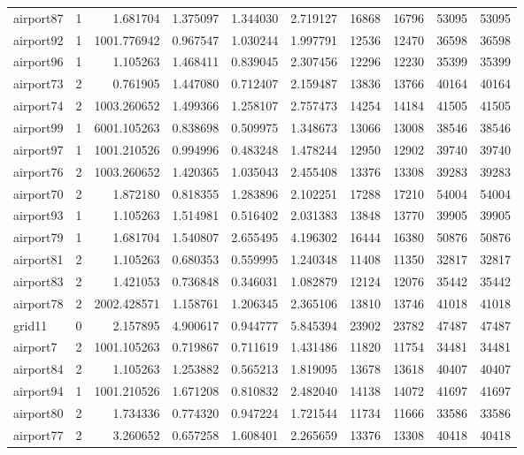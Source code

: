 \begin{longtable}{|l|r|r|r|r|r|r|r|r|r|}
airport87 & 1 & 1.681704 & 1.375097 & 1.344030 & 2.719127 & 16868 & 16796 & 53095 & 53095 \\
airport92 & 1 & 1001.776942 & 0.967547 & 1.030244 & 1.997791 & 12536 & 12470 & 36598 & 36598 \\
airport96 & 1 & 1.105263 & 1.468411 & 0.839045 & 2.307456 & 12296 & 12230 & 35399 & 35399 \\
airport73 & 2 & 0.761905 & 1.447080 & 0.712407 & 2.159487 & 13836 & 13766 & 40164 & 40164 \\
airport74 & 2 & 1003.260652 & 1.499366 & 1.258107 & 2.757473 & 14254 & 14184 & 41505 & 41505 \\
airport99 & 1 & 6001.105263 & 0.838698 & 0.509975 & 1.348673 & 13066 & 13008 & 38546 & 38546 \\
airport97 & 1 & 1001.210526 & 0.994996 & 0.483248 & 1.478244 & 12950 & 12902 & 39740 & 39740 \\
airport76 & 2 & 1003.260652 & 1.420365 & 1.035043 & 2.455408 & 13376 & 13308 & 39283 & 39283 \\
airport70 & 2 & 1.872180 & 0.818355 & 1.283896 & 2.102251 & 17288 & 17210 & 54004 & 54004 \\
airport93 & 1 & 1.105263 & 1.514981 & 0.516402 & 2.031383 & 13848 & 13770 & 39905 & 39905 \\
airport79 & 1 & 1.681704 & 1.540807 & 2.655495 & 4.196302 & 16444 & 16380 & 50876 & 50876 \\
airport81 & 2 & 1.105263 & 0.680353 & 0.559995 & 1.240348 & 11408 & 11350 & 32817 & 32817 \\
airport83 & 2 & 1.421053 & 0.736848 & 0.346031 & 1.082879 & 12124 & 12076 & 35442 & 35442 \\
airport78 & 2 & 2002.428571 & 1.158761 & 1.206345 & 2.365106 & 13810 & 13746 & 41018 & 41018 \\
grid11 & 0 & 2.157895 & 4.900617 & 0.944777 & 5.845394 & 23902 & 23782 & 47487 & 47487 \\
airport7 & 2 & 1001.105263 & 0.719867 & 0.711619 & 1.431486 & 11820 & 11754 & 34481 & 34481 \\
airport84 & 2 & 1.105263 & 1.253882 & 0.565213 & 1.819095 & 13678 & 13618 & 40407 & 40407 \\
airport94 & 1 & 1001.210526 & 1.671208 & 0.810832 & 2.482040 & 14138 & 14072 & 41697 & 41697 \\
airport80 & 2 & 1.734336 & 0.774320 & 0.947224 & 1.721544 & 11734 & 11666 & 33586 & 33586 \\
airport77 & 2 & 3.260652 & 0.657258 & 1.608401 & 2.265659 & 13376 & 13308 & 40418 & 40418 \\

\end{longtable}
